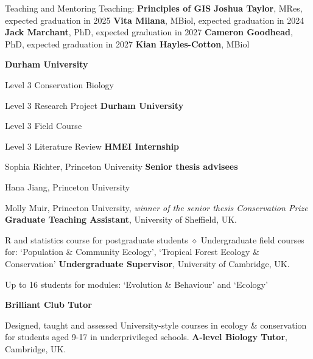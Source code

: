 \begin{rubric}{Teaching and Mentoring}
\entry*[2023-present] Teaching: \textbf{Principles of GIS}
\entry*[2024-present] \textbf{Joshua Taylor}, MRes, expected graduation in 2025
\entry*[2023-present] \textbf{Vita Milana}, MBiol, expected graduation in 2024
\entry*[2023-present] \textbf{Jack Marchant}, PhD, expected graduation in 2027
\entry*[2023-present] \textbf{Cameron Goodhead}, PhD, expected graduation in 2027
\entry*[2022-2023] \textbf{Kian Hayles-Cotton}, MBiol


\entry*[2023-present] \textbf{Durham University}
	\par Level 3 Conservation Biology
	\par Level 3 Research Project
\entry*[2022-present] \textbf{Durham University}
	\par Level 3 Field Course
	\par Level 3 Literature Review
\entry*[2021] \textbf{HMEI Internship}
	\par Sophia Richter, Princeton University
\entry*[2019 -- 2021] \textbf{Senior thesis advisees}
	\par Hana Jiang, Princeton University
	\par Molly Muir, Princeton University, \emph{winner of the senior thesis Conservation Prize}
\entry*[2014 -- 2018] \textbf{Graduate Teaching Assistant}, University of Sheffield, UK.
	\par R and statistics course for postgraduate students $\diamond$ Undergraduate field courses for: `Population \& Community Ecology', `Tropical Forest Ecology \& Conservation'
\entry*[2013 -- 2014] \textbf{Undergraduate Supervisor}, University of Cambridge, UK.
	\par Up to 16 students for modules: `Evolution \& Behaviour' and  `Ecology'


\entry*[2017 -- 2021] \textbf{Brilliant Club Tutor}
	\par Designed, taught and assessed University-style courses in ecology \& conservation for students aged 9-17 in underprivileged schools.
\entry*[2013 -- 2014] \textbf{A-level Biology Tutor}, Cambridge, UK.

\end{rubric}
